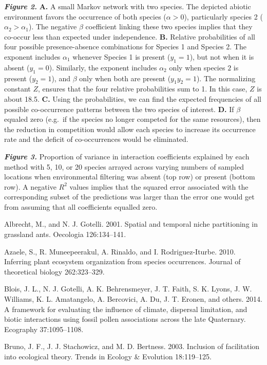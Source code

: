 \documentclass[12pt,]{article}
\begin{document}
\begin{spacing}{1.9}
\begin{flushleft}
\textbf{\emph{Figure 2.}} \textbf{A.} A small Markov network with two
species. The depicted abiotic environment favors the occurrence of both
species (\(\alpha >0\)), particularly species 2
(\(\alpha_2 > \alpha_1\)). The negative \(\beta\) coefficient linking
these two species implies that they co-occur less than expected under
independence. \textbf{B.} Relative probabilities of all four possible
presence-absence combinations for Species 1 and Species 2. The exponent
includes \(\alpha_1\) whenever Species 1 is present (\(y_1 = 1\)), but
not when it is absent (\(y_1 = 0\)). Similarly, the exponent includes
\(\alpha_2\) only when species \(2\) is present (\(y_2 = 1\)), and
\(\beta\) only when both are present (\(y_1y_2 = 1\)). The normalizing
constant \(Z\), ensures that the four relative probabilities sum to 1.
In this case, \(Z\) is about 18.5. \textbf{C.} Using the probabilities,
we can find the expected frequencies of all possible co-occurrence
patterns between the two species of interest. \textbf{D.} If \(\beta\)
equaled zero (e.g.~if the species no longer competed for the same
resources), then the reduction in competition would allow each species
to increase its occurrence rate and the deficit of co-occurrences would
be eliminated.

\textbf{\emph{Figure 3.}} Proportion of variance in interaction
coefficients explained by each method with 5, 10, or 20 species arrayed
across varying numbers of sampled locations when environmental filtering
was absent (top row) or present (bottom row). A negative \(R^2\) values
implies that the squared error associated with the corresponding subset
of the predictions was larger than the error one would get from assuming
that all coefficients equalled zero.

Albrecht, M., and N. J. Gotelli. 2001. Spatial and temporal niche
partitioning in grassland ants. Oecologia 126:134--141.

Azaele, S., R. Muneepeerakul, A. Rinaldo, and I. Rodriguez-Iturbe. 2010.
Inferring plant ecosystem organization from species occurrences. Journal
of theoretical biology 262:323--329.

Blois, J. L., N. J. Gotelli, A. K. Behrensmeyer, J. T. Faith, S. K.
Lyons, J. W. Williams, K. L. Amatangelo, A. Bercovici, A. Du, J. T.
Eronen, and others. 2014. A framework for evaluating the influence of
climate, dispersal limitation, and biotic interactions using fossil
pollen associations across the late Quaternary. Ecography 37:1095--1108.

Bruno, J. F., J. J. Stachowicz, and M. D. Bertness. 2003. Inclusion of
facilitation into ecological theory. Trends in Ecology \& Evolution
18:119--125.


\end{flushleft}
\end{spacing}
\end{document}
